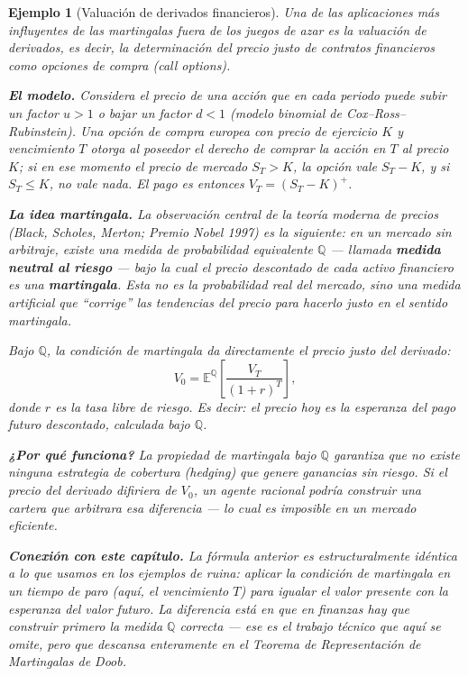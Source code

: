 \documentclass[12pt]{book}
\newtheorem{example}{Ejemplo}[chapter]
\begin{document}
\begin{example}[Valuación de derivados financieros]
\label{ej:finanzas}
    Una de las aplicaciones más influyentes de las martingalas fuera de los juegos de azar es la \emph{valuación de derivados}, es decir, la determinación del precio justo de contratos financieros como opciones de compra (\emph{call options}).

    \medskip
    \textbf{El modelo.} Considera el precio de una acción que en cada periodo puede subir un factor $u > 1$ o bajar un factor $d < 1$ (modelo binomial de Cox--Ross--Rubinstein). Una \emph{opción de compra europea} con precio de ejercicio $K$ y vencimiento $T$ otorga al poseedor el derecho de comprar la acción en $T$ al precio $K$; si en ese momento el precio de mercado $S_T > K$, la opción vale $S_T - K$, y si $S_T \le K$, no vale nada. El pago es entonces $V_T = (S_T - K)^+$.

    \medskip
    \textbf{La idea martingala.} La observación central de la teoría moderna de precios (Black, Scholes, Merton; Premio Nobel 1997) es la siguiente: en un mercado sin arbitraje, existe una \emph{medida de probabilidad equivalente} $\mathbb{Q}$ --- llamada \textbf{medida neutral al riesgo} --- bajo la cual el precio descontado de cada activo financiero es una \textbf{martingala}. Esta no es la probabilidad real del mercado, sino una medida artificial que ``corrige'' las tendencias del precio para hacerlo justo en el sentido martingala.

    Bajo $\mathbb{Q}$, la condición de martingala da directamente el precio justo del derivado:
    \[
        V_0 = \mathbb{E}^{\mathbb{Q}}\!\left[\frac{V_T}{(1+r)^T}\right],
    \]
    donde $r$ es la tasa libre de riesgo. Es decir: el precio hoy es la esperanza del pago futuro descontado, calculada bajo $\mathbb{Q}$.

    \medskip
    \textbf{¿Por qué funciona?} La propiedad de martingala bajo $\mathbb{Q}$ garantiza que no existe ninguna estrategia de cobertura (\emph{hedging}) que genere ganancias sin riesgo. Si el precio del derivado difiriera de $V_0$, un agente racional podría construir una cartera que arbitrara esa diferencia --- lo cual es imposible en un mercado eficiente.

    \medskip
    \textbf{Conexión con este capítulo.} La fórmula anterior es estructuralmente idéntica a lo que usamos en los ejemplos de ruina: aplicar la condición de martingala en un tiempo de paro (aquí, el vencimiento $T$) para igualar el valor presente con la esperanza del valor futuro. La diferencia está en que en finanzas hay que construir primero la medida $\mathbb{Q}$ correcta --- ese es el trabajo técnico que aquí se omite, pero que descansa enteramente en el Teorema de Representación de Martingalas de Doob.
\end{example}
\end{document}
